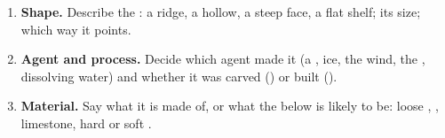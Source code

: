 \begin{method}
\begin{enumerate}
  \item \textbf{Shape.} Describe the : a ridge, a hollow, a steep
        face, a flat shelf; its size; which way it points.
  \item \textbf{Agent and process.} Decide which agent made it (a ,
        ice, the wind, the , dissolving water) and whether it was carved
        () or built ().
  \item \textbf{Material.} Say what it is made of, or what the  below
        is likely to be: loose , , limestone, hard or soft .
\end{enumerate}
\end{method}

